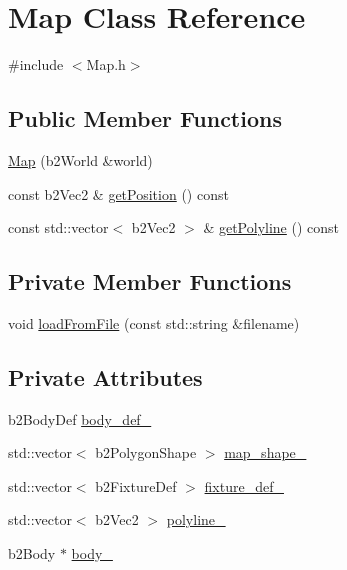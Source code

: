 \hypertarget{classMap}{}\section{Map Class Reference}
\label{classMap}


{\ttfamily \#include $<$Map.\+h$>$}

\subsection*{Public Member Functions}
\begin{DoxyCompactItemize}
\item 
\hyperlink{classMap_a8e8ddd7695e925a23af7b25078038f71}{Map} (b2\+World \&world)
\item 
const b2\+Vec2 \& \hyperlink{classMap_a09c9d761e0d6960ab6baf51310e6b28e}{get\+Position} () const
\item 
const std\+::vector$<$ b2\+Vec2 $>$ \& \hyperlink{classMap_a32d8cf8af3089a95e0471fd523050896}{get\+Polyline} () const
\end{DoxyCompactItemize}
\subsection*{Private Member Functions}
\begin{DoxyCompactItemize}
\item 
void \hyperlink{classMap_af2fd3dfd35ca7a85544a6c083e542f2f}{load\+From\+File} (const std\+::string \&filename)
\end{DoxyCompactItemize}
\subsection*{Private Attributes}
\begin{DoxyCompactItemize}
\item 
b2\+Body\+Def \hyperlink{classMap_a1913e9e11e4e52ef5b71c31a41badfe9}{body\+\_\+def\+\_\+}
\item 
std\+::vector$<$ b2\+Polygon\+Shape $>$ \hyperlink{classMap_a831c5a01dc023fc32f11d267d693eec8}{map\+\_\+shape\+\_\+}
\item 
std\+::vector$<$ b2\+Fixture\+Def $>$ \hyperlink{classMap_a4ca70bdb2efc0b2a59018280f8d63419}{fixture\+\_\+def\+\_\+}
\item 
std\+::vector$<$ b2\+Vec2 $>$ \hyperlink{classMap_a6bb2e5bde1854c9ceb4ad7d0349aa878}{polyline\+\_\+}
\item 
b2\+Body $\ast$ \hyperlink{classMap_a195872fd7eb8c84db43a75bf27a6a2f2}{body\+\_\+}
\end{DoxyCompactItemize}
